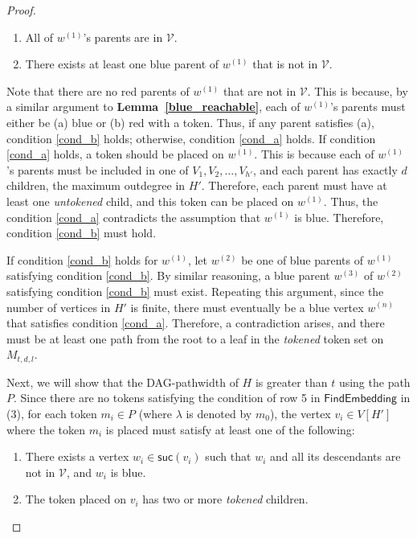 \documentclass[runningheads]{llncs}
\theoremstyle{plain}
\theoremstyle{definition}
\begin{document}
\begin{proof}
\begin{enumerate}
    \item All of $w^{(1)}$'s parents are in $\mathcal{V}$. \label{cond_a}
    \item There exists at least one blue parent of $w^{(1)}$ that is not in $\mathcal{V}$. \label{cond_b}
\end{enumerate}

    Note that there are no red parents of $w^{(1)}$ that are not in $\mathcal{V}$. This is because, by a similar argument to \textbf{Lemma~\ref{blue_reachable}}, each of $w^{(1)}$'s parents must either be (a) blue or (b) red with a token. Thus, if any parent satisfies (a), condition \ref{cond_b} holds; otherwise, condition \ref{cond_a} holds. If condition \ref{cond_a} holds, a token should be placed on $w^{(1)}$. This is because each of $w^{(1)}$'s parents must be included in one of $V_1, V_2, \dots, V_{h'}$, and each parent has exactly $d$ children, the maximum outdegree in $H'$. Therefore, each parent must have at least one \textit{untokened} child, and this token can be placed on $w^{(1)}$. Thus, the condition \ref{cond_a} contradicts the assumption that $w^{(1)}$ is blue. Therefore, condition \ref{cond_b} must hold. 
    
    If condition \ref{cond_b} holds for $w^{(1)}$, let $w^{(2)}$ be one of blue parents of $w^{(1)}$ satisfying condition \ref{cond_b}. By similar reasoning, a blue parent $w^{(3)}$ of $w^{(2)}$ satisfying condition \ref{cond_b} must exist. Repeating this argument, since the number of vertices in $H'$ is finite, there must eventually be a blue vertex $w^{(n)}$ that satisfies condition \ref{cond_a}. Therefore, a contradiction arises, and there must be at least one path from the root to a leaf in the \textit{tokened} token set on $M_{t, d, l}$.
    
    Next, we will show that the DAG-pathwidth of $H$ is greater than $t$ using the path $P$. Since there are no tokens satisfying the condition of row 5 in $\mathsf{FindEmbedding}$ in (3), for each token $m_i \in P$ (where $\lambda$ is denoted by $m_0$), the vertex $v_i \in V[H']$ where the token $m_i$ is placed must satisfy at least one of the following:
    
    \begin{enumerate}
        \item There exists a vertex $w_i \in \mathsf{suc}(v_i)$ such that $w_i$ and all its descendants are not in $\mathcal{V}$, and $w_i$ is blue. \label{cond1}
        \item The token placed on $v_i$ has two or more \textit{tokened} children. \label{cond2}
    \end{enumerate}
    

\end{proof}
\end{document}

